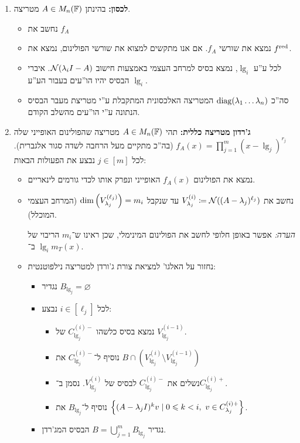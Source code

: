 \documentclass[name=רשימות אלגברה לינארית 2א]{../../../tex/classes/megasumPreamble}
\begin{document}
	\begin{enumerate}[A']
		\item \textbf{לכסון: }בהינתן $A \in M_n(\mathbb{F})$ מטריצה. 
		\begin{itemize}
			\item נחשב את $f_A$
			\item נמצא את שורשי $f_A$. אם אנו מתקשים למצוא את שורשי הפולינום, נמצא את $f^{\mathrm{red}}$. 
			\item לכל ע''ע $\lg_i$, נמצא בסיס למרחב העצמי באמצעות חישוב $\mathcal{N}(\lambda_i I - A)$. איברי הבסיס יהיו הו''עים בעבור הע''ע $\lg_i$. 
			\item סה''כ $\operatorname{diag}(\lambda_1 \dots \lambda_n)$ המטריצה האלכסונית המתקבלת ע''י מטריצת מעבר הבסיס הנתונה ע''י הו''עים מהשלב הקודם. 
		\end{itemize}
		
		\item \textbf{ג'רדון מטריצה כללית: }
			תהי $A \in M_n(\mathbb{F})$ מטריצה שהפולינום האופייני שלה $f_A(x) = \prod_{j = 1}^{m}(x - \lg_j)^{r_j}$ (בה''כ מתקיים מעל הרחבה לשדה סגור אלגברית). לכל $j \in [m]$ נבצע את הפעולות הבאות: 
			\begin{itemize}
				\item נמצא את הפולינום $f_A(x)$ האופייני ונפרק אותו לכדי גורמים לינאריים. 
				\item נחשב את $V_{\lambda_j}^{(i)} \coloneqq \mathcal{N}((A - \lambda_j)^{\ell_j})$ עד שנקבל $\dim\left ( V_{\lambda_j}^{(\ell_j)} \right ) = m_i$ (המרחב העצמי המוכלל). 
				
				\textit{הערה: }אפשר באופן חלופי לחשב את הפולינום המינימלי, שכן ראינו ש־$m_i$ הריבוי של $\lg_i$ ב־$m_T(x)$. 
				\item נחזור על האלגו' למציאת צורת ג'ורדן למטריצה נילפוטנטית: 
				\begin{itemize}
					\item נגדיר $B_{\lg_j} = \varnothing$
					\item לכל $i \in [\ell_j]$ נבצע: 
					\begin{itemize}
						\item נמצא בסיס כלשהו $C_{\lg_j}^{(i)-}$ של $V_{\lg_j}^{(i - 1)}$. 
						\item נוסיף ל־$C_{\lg_j}^{(i)-}$ את $B \cap (V_{\lg_j}^{(i)} \setminus V_{\lg_j}^{(i - 1)})$
						\item נשלים את $C_{\lg_j}^{(i)-}$ לבסיס של $V_{\lg_j}^{(i)}$. נסמן ב־$C_{\lg_j}^{(i)+}$. 
						\item נוסיף ל־$B_{\lg_j}$ את $\left \{ (A - \lambda_jI)^{k}v \mid 0 \leqslant k < i, \ v \in C_{\lambda_j}^{(i)+} \right \}$. 
					\end{itemize}
					\item נגדיר $B = \bigcup_{j = 1}^{m} B_{\lg_j}$ הבסיס המג'רדן. 
				\end{itemize}
			\end{itemize}
		

\end{enumerate}
\end{document}
